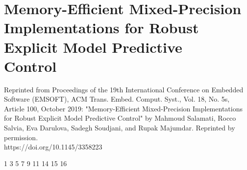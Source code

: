 
\chapter{Memory-Efficient Mixed-Precision Implementations for Robust\\Explicit Model Predictive\\Control}
\label{sec:emsoft}
Reprinted from Proceedings of the 19th International Conference on Embedded Software (EMSOFT), ACM Trans. Embed. Comput. Syst., Vol. 18, No. 5s, Article 100, October 2019: "Memory-Efficient Mixed-Precision Implementations for Robust Explicit Model Predictive Control" by Mahmoud Salamati, Rocco Salvia, Eva Darulova, Sadegh Soudjani, and Rupak Majumdar. Reprinted by permission.\\
https://doi.org/10.1145/3358223

\setupuuchapterbib

                              {1}
                            		{3}
       							{5}
                      		{7}
						{9}
                      {11}
       						{14}
                      			{15}
                              	{16}


